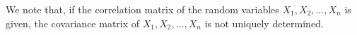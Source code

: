 
We note that, if the correlation matrix of the random variables $X_1, X_2, \ldots,
X_n$ is given, the covariance matrix of $X_1, X_2, \ldots, X_n$ is not uniquely
determined.

